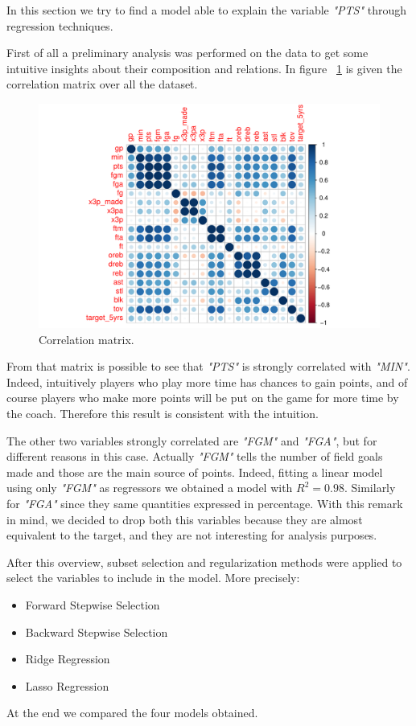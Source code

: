 In this section we try to find a model able to explain the variable \textit{"PTS"} through regression techniques.

First of all a preliminary analysis was performed on the data to get some intuitive insights about their composition and relations.
In figure \Fig~\ref{fig:CorrMatrix} is given the correlation matrix over all the dataset.
\begin{figure}[h]
	\centering
	\includegraphics[width=0.5\linewidth]{ImageFiles/Regression/CorrMatrix}
	\caption{Correlation matrix.}
	\label{fig:CorrMatrix}
\end{figure}

From that matrix is possible to see that \textit{"PTS"} is strongly correlated with \textit{"MIN"}. Indeed, intuitively players who play more time has chances to gain points, and of course players who make more points will be put on the game for more time by the coach. Therefore this result is consistent with the intuition.

The other two variables strongly correlated are \textit{"FGM"} and \textit{"FGA"}, but for different reasons in this case. Actually \textit{"FGM"} tells the number of field goals made and those are the main source of points. Indeed, fitting a linear model using only \textit{"FGM"} as regressors we obtained a model with $R^2 = 0.98$. Similarly for \textit{"FGA"} since they same quantities expressed in percentage. With this remark in mind, we decided to drop both this variables because they are almost equivalent to the target, and they are not interesting for analysis purposes.

After this overview, subset selection and regularization methods were applied to select the variables to include in the model. More precisely:
\begin{itemize}
	\item Forward Stepwise Selection
	\item Backward Stepwise Selection
	\item Ridge Regression
	\item Lasso Regression
\end{itemize}

At the end we compared the four models obtained.
